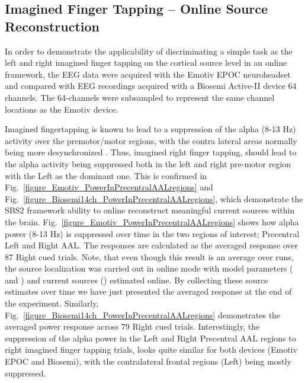 \documentclass[10pt]{article}
\begin{document}
\begin{center}
	\subsection{Imagined Finger Tapping -- Online Source Reconstruction}
In order to demonstrate the applicability of discriminating a simple task as the left and right imagined finger tapping on the cortical source level in an online framework, the EEG data were acquired with the Emotiv EPOC neuroheadset and compared with EEG recordings acquired with a Biosemi Active-II device 64 channels. The 64-channels were subsampled to represent the same channel locations as the Emotiv device.



Imagined fingertapping is known to lead to a suppression of the alpha (8-13 Hz) activity over the premotor/motor regions, with the contra lateral areas normally being more desynchronized \cite{pfurtscheller1999event}. Thus, imagined right finger tapping, should lead to the alpha activity being suppressed both in the left and right pre-motor region with the Left as the dominant one.
This is confirmed in Fig.~\ref{figure_Emotiv_PowerInPrecentralAALregions} and Fig.~\ref{figure_Biosemi14ch_PowerInPrecentralAALregions}, which demonstrate the SBS2 framework ability to online reconstruct meaningful current sources within the brain. Fig.~\ref{figure_Emotiv_PowerInPrecentralAALregions} shows how alpha power (8-13 Hz) is suppressed over time in the two regions of interest; Precentral Left and Right AAL. The responses are calculated as the averaged response over 87 Right cued trials. Note, that even though this result is an average over runs, the source localization was carried out in online mode with model parameters ( and ) and current sources () estimated online. By collecting these source estimates over time we have just presented the averaged response at the end of the experiment. Similarly, Fig.~\ref{figure_Biosemi14ch_PowerInPrecentralAALregions} demonstrates the averaged power response across 79 Right cued trials.
Interestingly, the suppression of the alpha power in the Left and Right Precentral AAL regions to right imagined finger tapping trials, looks quite similar for both devices (Emotiv EPOC and Biosemi), with the contralateral frontal regions (Left) being mostly suppressed.
\iffalse{
Similarly, a left imagined fingertapping cue leads to more suppressed alpha activity of right frontal regions during task execution as demonstrated in Fig.~\ref{figure_Emotiv_3Dsourcerecon_Trial190Left_6timepoints}. Additionally, the figure shows how the alpha power in the end of the trial is recovering to its initial state.
}\fi


\end{center}
\end{document}
